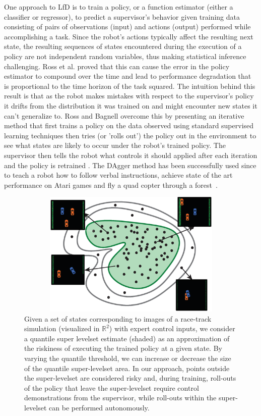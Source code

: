 \documentclass[10pt, conference]{ieeeconf}      %
\begin{document}
One approach to LfD is to train a policy, or a function estimator (either a classifier or regressor), to predict a
supervisor's behavior given training data consisting of pairs of observations (input) and actions (output) performed
while accomplishing a task. Since the robot's actions typically affect the resulting next state, the resulting sequences
of states encountered during the execution of a policy are not independent random variables, thus making statistical
inference challenging. Ross et al. proved that this can cause the error in the policy estimator to compound over the
time and lead to performance degradation that is proportional to the time horizon of the task squared. The intuition
behind this result is that as the robot makes mistakes with respect to the supervisor's policy it drifts from the
distribution it was trained on and might encounter new states it can't generalize to.  Ross and Bagnell overcome this by
presenting an iterative method that first trains a policy on the data observed using standard supervised learning
techniques then tries (or 'rolls out') the policy out in the environment to see what states are likely to occur under
the robot's trained policy.  The supervisor then tells the robot what controls it should applied after each iteration
and the policy is retrained \cite{ross2010reduction}. The DAgger method has been successfully used since to teach a
robot how to follow verbal instructions, achieve state of the art performance on Atari games and fly a quad copter
through a forest~\cite{NIPS2014_5421,duvallet2013imitation,ross2013learning}.




\begin{figure}[t!]
\centering
\includegraphics[width=12cm, height=6cm]{figures/teaser.eps}
\caption{ 
Given a set of states corresponding to images of a race-track simulation (visualized in $\mathbb{R}^2$) with expert
control inputs, we consider a quantile super levelset estimate (shaded) as an approximation of the riskiness of
executing the trained policy at a given state. By varying the quantile threshold, we can increase or decrease the size
of the quantile super-levelset area. In our approach, points outside the super-levelset are considered risky and, during
training, roll-outs of the policy that leave the super-levelset require control demonstrations from the supervisor,
while roll-outs within the super-levelset can be performed autonomously.
}
\vspace*{-10pt}
\label{fig:dis_traveled}
\end{figure}
\end{document}
